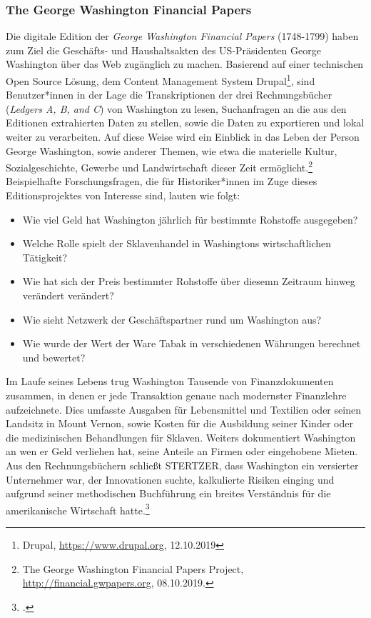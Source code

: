 \documentclass[12pt,a4paper]{article}
\begin{document}
\subsubsection{The George Washington Financial Papers}
Die digitale Edition der \textit{George Washington Financial Papers} (1748-1799) haben zum Ziel die Geschäfts- und Haushaltsakten des US-Präsidenten George Washington über das Web zugänglich zu machen. Basierend auf einer technischen Open Source Lösung, dem Content Management System Drupal\footnote{Drupal, \protect\url{https://www.drupal.org}, 12.10.2019}, sind Benutzer*innen in der Lage die Transkriptionen der drei Rechnungsbücher (\textit{Ledgers A, B, and C}) von Washington zu lesen, Suchanfragen an die aus den Editionen extrahierten Daten zu stellen, sowie die Daten zu exportieren und lokal weiter zu verarbeiten. Auf diese Weise wird ein Einblick in das Leben der Person George Washington, sowie  anderer Themen, wie etwa die materielle Kultur, Sozialgeschichte, Gewerbe und Landwirtschaft dieser Zeit ermöglicht.\footnote{The George Washington Financial Papers Project, \protect\url{http://financial.gwpapers.org}, 08.10.2019.} Beispielhafte Forschungsfragen, die für Historiker*innen im Zuge dieses Editionsprojektes von Interesse sind, lauten wie folgt: 
\begin{itemize}
\item Wie viel Geld hat Washington jährlich für bestimmte Rohstoffe ausgegeben?
\item Welche Rolle spielt der Sklavenhandel in Washingtons wirtschaftlichen Tätigkeit?
\item Wie hat sich der Preis bestimmter Rohstoffe über diesemn Zeitraum hinweg verändert verändert?
\item Wie sieht Netzwerk der Geschäftspartner rund um Washington aus?
\item Wie wurde der Wert der Ware Tabak in verschiedenen Währungen berechnet und bewertet?
\end{itemize}
Im Laufe seines Lebens trug Washington Tausende von Finanzdokumenten zusammen, in denen er jede Transaktion genaue nach modernster Finanzlehre aufzeichnete. Dies umfasste Ausgaben für Lebensmittel und Textilien oder seinen Landsitz in Mount Vernon, sowie Kosten für die Ausbildung seiner Kinder oder die medizinischen Behandlungen für Sklaven. Weiters dokumentiert Washington an wen er Geld verliehen hat, seine Anteile an Firmen oder eingehobene Mieten.
Aus den Rechnungsbüchern schließt STERTZER, dass Washington ein versierter Unternehmer war, der Innovationen suchte, kalkulierte Risiken einging und aufgrund seiner methodischen Buchführung ein breites Verständnis für die amerikanische Wirtschaft hatte.\footcite[][]{stertzer2014working}
\end{document}
